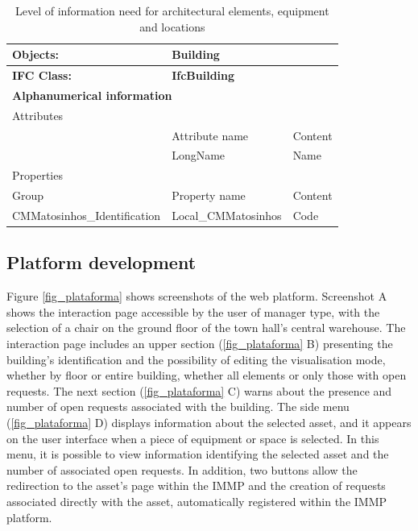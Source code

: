 \documentclass[a4paper, 10pt, twocolumn, twoside]{article}
\begin{document}
\begin{table}[!htb]
    \renewcommand{\arraystretch}{2}
    \centering
    \caption{Level of information need for architectural elements, equipment and locations}
    \label{tab_loin_building}
    \begin{tabular}{p{5.1cm}|p{4.3cm}|p{4.3cm}}
    \hline
    \textbf{Objects:} & \multicolumn{2}{l}{\textbf{Building}}\\
    \hline
    \textbf{IFC Class:} & \multicolumn{2}{l}{\textbf{IfcBuilding}}\\
    \hline
    \multicolumn{3}{l}{\textbf{Alphanumerical information}} \\
    \hline
    \multicolumn{3}{l}{Attributes} \\
    \hline
    & Attribute name & Content\\
    \hline
    & LongName & Name\\
    \hline
    \multicolumn{3}{l}{Properties} \\
    \hline
    Group & Property name & Content\\
    \hline
    CMMatosinhos\_Identification & Local\_CMMatosinhos & Code\\
    \hline
    \end{tabular}
\end{table}

\subsection{Platform development}
\label{subsec:platform}

Figure \ref{fig_plataforma} shows screenshots of the web platform. Screenshot A shows the interaction page accessible by the user of manager type, with the selection of a chair on the ground floor of the town hall's central warehouse. The interaction page includes an upper section (\ref{fig_plataforma} B) presenting the building's identification and the possibility of editing the visualisation mode, whether by floor or entire building, whether all elements or only those with open requests. The next section (\ref{fig_plataforma} C) warns about the presence and number of open requests associated with the building. The side menu (\ref{fig_plataforma} D) displays information about the selected asset, and it appears on the user interface when a piece of equipment or space is selected. In this menu, it is possible to view information identifying the selected asset and the number of associated open requests. In addition, two buttons allow the redirection to the asset's page within the IMMP and the creation of requests associated directly with the asset, automatically registered within the IMMP platform.
\end{document}
